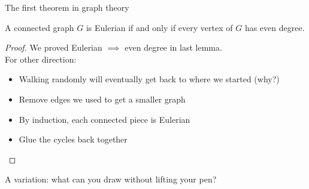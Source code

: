 \documentclass{beamer}
\begin{document}
\begin{frame}{The first theorem in graph theory}
  \begin{theorem}[Euler] A connected graph $G$ is Eulerian if and only if every vertex of $G$ has even degree.
  \end{theorem}
  \begin{proof}
    We proved Eulerian $\implies$ even degree in last lemma. \\
    For other direction:
    \begin{itemize}
    \item Walking randomly will eventually get back to where we started (why?)
    \item Remove edges we used to get a smaller graph
    \item By induction, each connected piece is Eulerian 
    \item Glue the cycles back together
    \end{itemize}
  \end{proof}
\end{frame}





\begin{frame}{A variation: what can you draw without lifting your pen?}





\end{frame}
\end{document}
